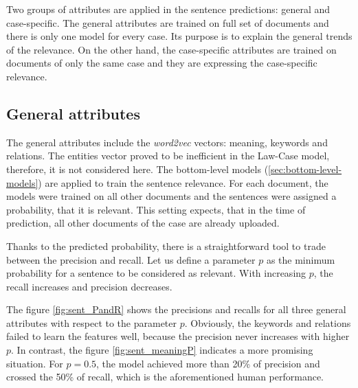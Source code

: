 \documentclass[
  digital, %
  notable,   %
  nolof,     %
  nolot,     %
]{fithesis3}
\begin{document}
Two groups of attributes are applied in the sentence predictions: general and case-specific. 
The general attributes are trained on full set of documents and there is only one model for every case.
Its purpose is to explain the general trends of the relevance.
On the other hand, the case-specific attributes are trained on documents of only the same case and they are expressing the case-specific relevance.

\subsection{General attributes}
The general attributes include the \textit{word2vec} vectors: meaning, keywords and relations.
The entities vector proved to be inefficient in the Law-Case model, therefore, it is not considered here.
The bottom-level models (\ref{sec:bottom-level-models}) are applied to train the sentence relevance.
For each document, the models were trained on all other documents and the sentences were assigned a probability, that it is relevant.
This setting expects, that in the time of prediction, all other documents of the case are already uploaded.

Thanks to the predicted probability, there is a straightforward tool to trade between the precision and recall.
Let us define a parameter $p$ as the minimum probability for a sentence to be considered as relevant.
With increasing $p$, the recall increases and precision decreases.

The figure \ref{fig:sent_PandR} shows the precisions and recalls for all three general attributes with respect to the parameter $p$.
Obviously, the keywords and relations failed to learn the features well, because the precision never increases with higher $p$.
In contrast, the figure \ref{fig:sent_meaningP} indicates a more promising situation.
For $p=0.5$, the model achieved more than 20\% of precision and crossed the 50\% of recall, which is the aforementioned human performance.
\end{document}
